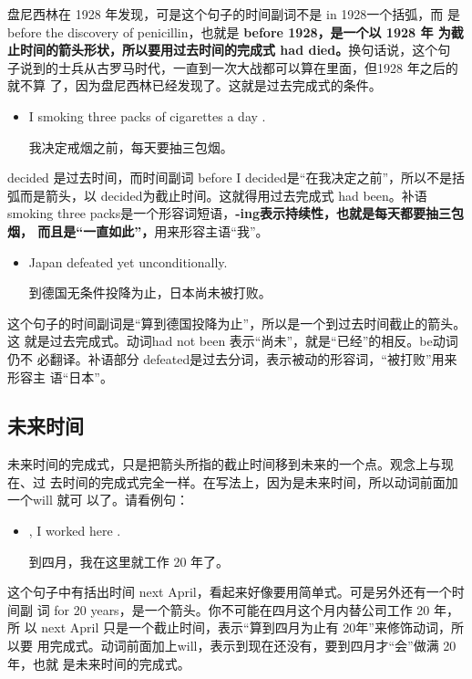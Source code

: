 盘尼西林在 1928 年发现，可是这个句子的时间副词不是 in 1928一个括弧，而
是 before the discovery of penicillin，也就是 \textbf{before 1928，是一个以 1928 年
  为截止时间的箭头形状，所以要用过去时间的完成式 had died。}换句话说，这个句
子说到的士兵从古罗马时代，一直到一次大战都可以算在里面，但1928 年之后的就不算
了，因为盘尼西林已经发现了。这就是过去完成式的条件。

\begin{itemize}
\item  I  smoking three packs of cigarettes a day .

  我决定戒烟之前，每天要抽三包烟。
\end{itemize}

decided 是过去时间，而时间副词 before I decided是“在我决定之前”，所以不是括
弧而是箭头，以 decided为截止时间。这就得用过去完成式 had been。补语 smoking
three packs是一个形容词短语，\textbf{-ing表示持续性，也就是每天都要抽三包烟，
  而且是“一直如此”，}用来形容主语“我”。


\begin{itemize}
\item  Japan  defeated yet  unconditionally.

  到德国无条件投降为止，日本尚未被打败。
\end{itemize}

这个句子的时间副词是“算到德国投降为止”，所以是一个到过去时间截止的箭头。这
就是过去完成式。动词had not been 表示“尚未”，就是“已经”的相反。be动词仍不
必翻译。补语部分 defeated是过去分词，表示被动的形容词，“被打败”用来形容主
语“日本”。

\subsection{未来时间}

未来时间的完成式，只是把箭头所指的截止时间移到未来的一个点。观念上与现在、过
去时间的完成式完全一样。在写法上，因为是未来时间，所以动词前面加一个will 就可
以了。请看例句：

\begin{itemize}
\item  {}, I  worked here .

  到四月，我在这里就工作 20 年了。
\end{itemize}

这个句子中有括出时间 next April，看起来好像要用简单式。可是另外还有一个时间副
词 for 20 years，是一个箭头。你不可能在四月这个月内替公司工作 20 年，所
以 next April 只是一个截止时间，表示“算到四月为止有 20年”来修饰动词，所以要
用完成式。动词前面加上will，表示到现在还没有，要到四月才“会”做满 20年，也就
是未来时间的完成式。

